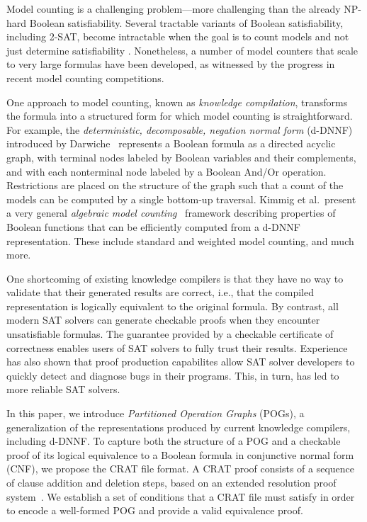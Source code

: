 \documentclass[letterpaper,USenglish,cleveref, autoref, thm-restate]{lipics-v2021}
\begin{document}
Model counting is a challenging problem---more challenging than the
already NP-hard Boolean satisfiability.  Several
tractable variants of Boolean satisfiability, including 2-SAT, become
intractable when the goal is to count models and not just determine
satisfiability \cite{valiant:siam:1979}.  Nonetheless, a number of
model counters that scale to very large formulas have been developed, as
witnessed by the progress in recent model counting competitions.

One approach to model counting, known as {\em knowledge compilation},
transforms the formula into a structured form for which model counting
is straightforward.  For example, the {\em deterministic,
  decomposable, negation normal form} (d-DNNF) introduced by
Darwiche~\cite{darwiche:aaai:2002,darwiche:ecai:2004} represents a
Boolean formula as a directed acyclic graph, with terminal nodes
labeled by Boolean variables and their complements, and with each
nonterminal node labeled by a Boolean And/Or operation.  Restrictions
are placed on the structure of the graph such that a count of the
models can be computed by a single bottom-up traversal.
Kimmig et al.\ present a very general {\em
  algebraic model counting}~\cite{kimmig:jal:2017} framework describing
properties of Boolean functions that can be efficiently computed from
a d-DNNF representation.  These include standard and weighted model
counting, and much more.

One shortcoming of existing knowledge compilers is that they have no
way to validate that their generated results are correct, i.e., that
the compiled representation is logically equivalent to the original
formula.  By contrast, all modern SAT solvers can generate
checkable proofs when they encounter unsatisfiable formulas.  The
guarantee provided by a checkable certificate of correctness enables
users of SAT solvers to fully trust their results.  Experience has also
shown that proof production capabilites allow SAT solver developers to quickly
detect and diagnose bugs in their programs. This, in turn, has led
to more reliable SAT solvers.

In this paper, we introduce \emph{Partitioned Operation Graphs} (POGs),
a generalization of the representations produced by current knowledge
compilers, including d-DNNF\@. To capture both the structure of a POG
and a checkable proof of its logical equivalence to a Boolean formula in
conjunctive normal form (CNF), we propose the CRAT file format. A CRAT
proof consists of a sequence of clause addition and deletion steps,
based on an extended resolution proof system~\cite{Tseitin:1983}.
We establish a set of conditions that a CRAT file must satisfy in order to
encode a well-formed POG and provide a valid equivalence proof.
\end{document}
